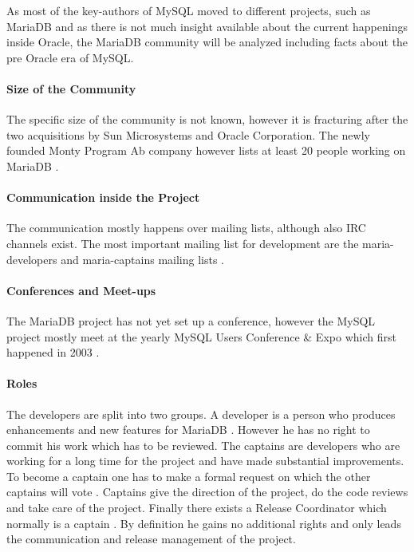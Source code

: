 As most of the key-authors of MySQL moved to different projects, such as
MariaDB and as there is not much insight available about the current happenings
inside Oracle, the MariaDB community will be analyzed including facts about the
pre Oracle era of MySQL.

\paragraph{Size of the Community}

The specific size of the community is not known, however it is fracturing after
the two acquisitions by Sun Microsystems and Oracle Corporation. The newly
founded Monty Program Ab company however lists at least 20 people working on
MariaDB \cite{MySQLBehind}.

\paragraph{Communication inside the Project}

The communication mostly happens over mailing lists, although also \ac{IRC}
channels exist. The most important mailing list for development are the
maria-developers and maria-captains mailing lists \cite{MySQLDevelopers}.

\paragraph{Conferences and Meet-ups}

The MariaDB project has not yet set up a conference, however the MySQL project
mostly meet at the yearly MySQL Users Conference \& Expo which first happened
in 2003 \cite{MySQLConference}.

\paragraph{Roles}

The developers are split into two groups. A developer is a person who produces
enhancements and new features for MariaDB
\cite{MySQLContributingCode,MySQLContributing,MySQLCaptain}. However he has no
right to commit his work which has to be reviewed. The captains are developers
who are working for a long time for the project and have made substantial
improvements. To become a captain one has to make a formal request on which the
other captains will vote \cite{MySQLCaptain}. Captains give the direction of
the project, do the code reviews and take care of the project. Finally there
exists a Release Coordinator which normally is a captain
\cite{MySQLReleaseCoordinator}. By definition he gains no additional rights and
only leads the communication and release management of the project.

